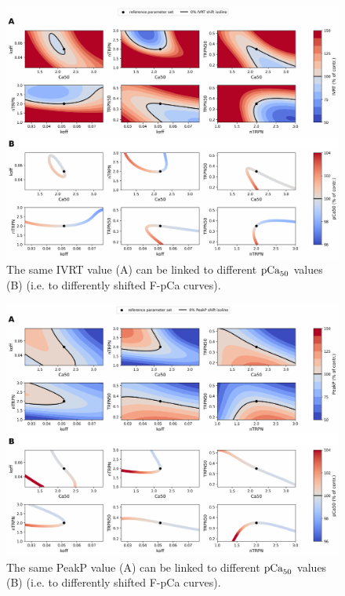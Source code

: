 \begin{figure}[ht!]
    \myfloatalign
    \includegraphics[width=\textwidth]{figures/chapter08/Fig6_IVRT.pdf}
    \caption{The same IVRT value (A) can be linked to different $\textrm{pCa}_{50}$ values (B) (i.e. to differently shifted F-pCa curves).}
    \label{fig:IVRTisolines}
\end{figure}

\begin{figure}[ht!]
    \myfloatalign
    \includegraphics[width=\textwidth]{figures/chapter08/Fig6_PeakP.pdf}
    \caption{The same PeakP value (A) can be linked to different $\textrm{pCa}_{50}$ values (B) (i.e. to differently shifted F-pCa curves).}
    \label{fig:PeakPisolines}
\end{figure}

